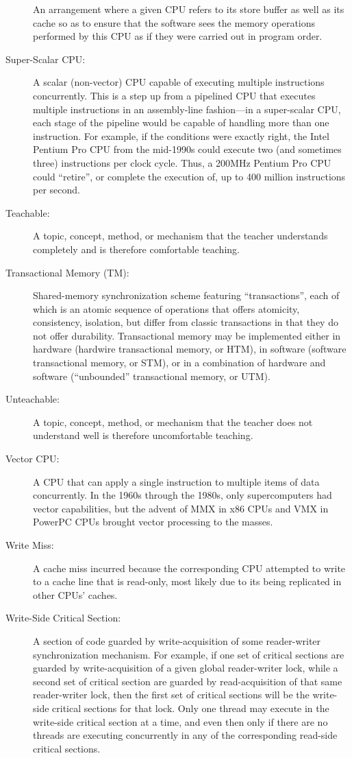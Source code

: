 \begin{description}
	An arrangement where a given CPU refers to its store buffer
	as well as its cache so as to ensure that the software sees
	the memory operations performed by this CPU as if they
	were carried out in program order.
\item[Super-Scalar CPU:]
	A scalar (non-vector) CPU capable of executing multiple instructions
	concurrently.
	This is a step up from a pipelined CPU that executes multiple
	instructions in an assembly-line fashion---in a super-scalar
	CPU, each stage of the pipeline would be capable of handling
	more than one instruction.
	For example, if the conditions were exactly right,
	the Intel Pentium Pro CPU from the mid-1990s could
	execute two (and sometimes three) instructions per clock cycle.
	Thus, a 200MHz Pentium Pro CPU could ``retire'', or complete the
	execution of, up to 400 million instructions per second.
\item[Teachable:]
	A topic, concept, method, or mechanism that the teacher understands
	completely and is therefore comfortable teaching.
\item[Transactional Memory (TM):]
	Shared-memory synchronization scheme featuring ``transactions'',
	each of which is an atomic sequence of operations
	that offers atomicity, consistency, isolation, but differ from
	classic transactions in that they do not offer
	durability.
	Transactional memory may be implemented either in hardware
	(hardwire transactional memory, or HTM), in software (software
	transactional memory, or STM), or in a combination of hardware
	and software (``unbounded'' transactional memory, or UTM).
\item[Unteachable:]
	A topic, concept, method, or mechanism that the teacher does
	not understand well is therefore uncomfortable teaching.
\item[Vector CPU:]
	A CPU that can apply a single instruction to multiple items of
	data concurrently.
	In the 1960s through the 1980s, only supercomputers had vector
	capabilities, but the advent of MMX in x86 CPUs and VMX in
	PowerPC CPUs brought vector processing to the masses.
\item[Write Miss:]
	A cache miss incurred because the corresponding CPU attempted
	to write to a cache line that is read-only, most likely due
	to its being replicated in other CPUs' caches.
\item[Write-Side Critical Section:]
	A section of code guarded by write-acquisition of
	some reader-writer synchronization mechanism.
	For example, if one set of critical sections are guarded by
	write-acquisition of
	a given global reader-writer lock, while a second set of critical
	section are guarded by read-acquisition of that same reader-writer
	lock, then the first set of critical sections will be the
	write-side critical sections for that lock.
	Only one thread may execute in the write-side critical section
	at a time, and even then only if there are no threads are
	executing concurrently in any of the corresponding read-side
	critical sections.
\end{description}
